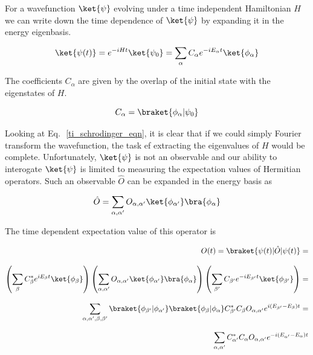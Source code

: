 For a wavefunction $\ket{\psi}$ evolving under a time independent Hamiltonian $H$ we can write down the time dependence of $\ket{\psi}$ by expanding it in the
energy eigenbasis.

\begin{equation}
    \ket{\psi (t)} =e^{-i H t} \ket{\psi_{0}} = \sum_{\alpha} C_{\alpha} e^{-i E_{\alpha} t} \ket{\phi_{\alpha}}
    \label{ti_schrodinger_eqn}
\end{equation}

\noindent The coefficients $C_{\alpha}$ are given by the overlap of the initial state with the eigenstates of $H$.

\begin{equation}
    C_{\alpha} = \braket{\phi_{\alpha}|\psi_{0}}
\end{equation}

\noindent Looking at Eq.\,~\ref{ti_schrodinger_eqn}, it is clear that if we could simply Fourier transform the wavefunction, the task ef extracting the eigenvalues of $H$ would be complete.
Unfortunately, $\ket{\psi}$ is not an observable and our ability to interogate $\ket{\psi}$ is limited to measuring the expectation values of Hermitian operators.
Such an observable $\hat{O}$ can be expanded in the energy basis as

\begin{equation}
    \label{observable}
    \hat{O} = \sum_{\alpha,\alpha^{\prime}} O_{\alpha,\alpha^{\prime}} \ket{\phi_{\alpha^{\prime}}} \bra{\phi_{\alpha}}
\end{equation}

\noindent The time dependent expectation value of this operator is

\begin{equation*}
    \label{derive_energy_differences}
    \begin{aligned}
        O(t) =\braket{\psi(t)|\hat{O}|\psi(t)} = \\[2.0ex]
        \left( \sum_{\beta} C^{*}_{\beta} e^{i E_{\beta} t} \ket{\phi_{\beta}} \right)
        \left( \sum_{\alpha,\alpha^{\prime}} O_{\alpha,\alpha^{\prime}} \ket{\phi_{\alpha^{\prime}}} \bra{\phi_{\alpha}} \right)
        \left( \sum_{\beta^{\prime}} C_{\beta^{\prime}} e^{- i E_{\beta^{\prime}} t} \ket{\phi_{\beta^{\prime}}} \right) = \\[2.0ex]
        \sum_{\alpha, \alpha^{\prime}, \beta, \beta^{\prime} }
        \braket{\phi_{\beta^{\prime}}|\phi_{\alpha^{\prime}}}
        \braket{\phi_{\beta}|\phi_{\alpha}}
        C_{\beta^{\prime}}^{*} C_{\beta} O_{\alpha, \alpha^{\prime}} e^{i (E_{\beta^\prime} - E_{\beta}) t} = \\[2.0ex]
        \sum_{\alpha, \alpha^{\prime}} C^{*}_{\alpha^{\prime}} C_{\alpha} O_{\alpha, \alpha^{\prime}} e^{- i (E_{\alpha^{\prime}} - E_{\alpha}) t}
    \end{aligned}
\end{equation*}

